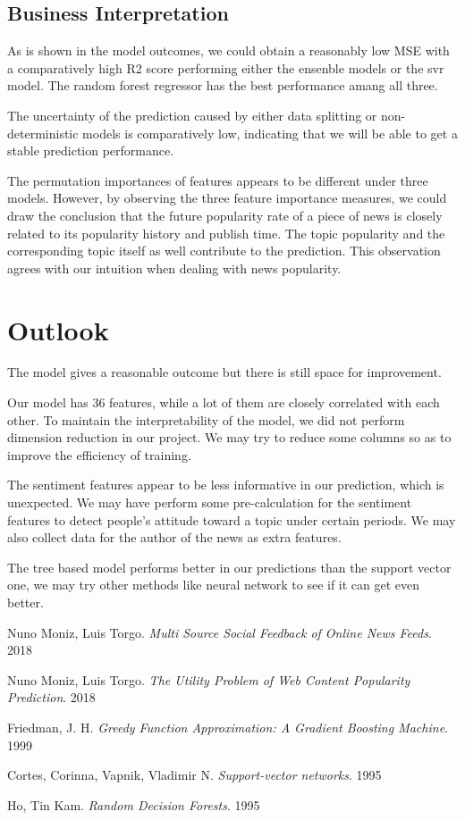 \documentclass{article}
\begin{document}
\subsection{Business Interpretation}

As is shown in the model outcomes, we could obtain a reasonably low MSE with a comparatively high R2 score performing either the ensenble models or the svr model. The random forest regressor has the best performance amang all three.\par
The uncertainty of the prediction caused by either data splitting or non-deterministic models is comparatively low, indicating that we will be able to get a stable prediction performance.\par
The permutation importances of features appears to be different under three models. However, by observing the three feature importance measures, we could draw the conclusion that the future popularity rate of a piece of news is closely related to its popularity history and publish time. The topic popularity and the corresponding topic itself as well contribute to the prediction. This observation agrees with our intuition when dealing with news popularity.

\section{Outlook}

The model gives a reasonable outcome but there is still space for improvement.\par
Our model has 36 features, while a lot of them are closely correlated with each other. To maintain the interpretability of the model, we did not perform dimension reduction in our project. We may try to reduce some columns so as to improve the efficiency of training.\par
The sentiment features appear to be less informative in our prediction, which is unexpected. We may have perform some pre-calculation for the sentiment features to detect people's attitude toward a topic under certain periods. We may also collect data for the author of the news as extra features.\par
The tree based model performs better in our predictions than the support vector one, we may try other methods like neural network to see if it can get even better.

\medskip

\begin{thebibliography}{}
 Nuno Moniz, Luis Torgo.
\textit{Multi Source Social Feedback of Online News Feeds}. 
 2018
 
 Nuno Moniz, Luis Torgo.
\textit{The Utility Problem of Web Content Popularity Prediction}.
 2018

Friedman, J. H. 
\textit{Greedy Function Approximation: A Gradient Boosting Machine}.
 1999

Cortes, Corinna, Vapnik, Vladimir N.
\textit{Support-vector networks}.
 1995

Ho, Tin Kam.
\textit{Random Decision Forests}.
 1995
\end{thebibliography}
\end{document}
